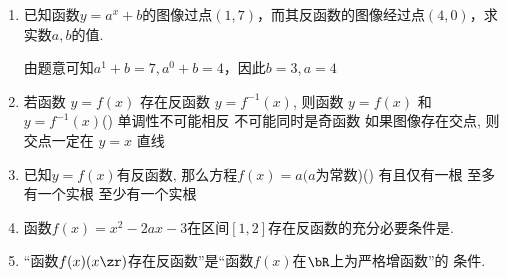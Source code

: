 \begin{enumerate}
        \item 已知函数$y = a^x+b$的图像过点$(1,7)$，而其反函数的图像经过点$(4, 0)$，求实数$a, b$的值.
        \begin{jieda}
            由题意可知$a^1+b=7, a^0+b=4$，因此$b = 3, a = 4$
        \end{jieda}
        
        \item 若函数 $y=f(x)$ 存在反函数 $y=f^{-1}(x)$, 则函数 $y=f(x)$ 和 $y=f^{-1}(x)$\dotfill()
        {单调性不可能相反}
        {不可能同时是奇函数}
        {如果图像存在交点, 则交点一定在 $y=x$ 直线}
        
        \item 已知$y=f(x)$有反函数, 那么方程$f(x)=a(a$为常数)\dotfill()
        {有且仅有一根}
        {至多有一个实根}
        {至少有一个实根}
        
        \item 函数$f(x)=x^2-2ax-3$在区间$[1,2]$存在反函数的充分必要条件是\blkda[4]{$a\in(-\infty,1]\cup[2,+\infty)$}.
        
        \item ``函数$f(x)(x\zr)$存在反函数''是``函数$f(x)$在$\bR$上为严格增函数''的 条件. 
    \end{enumerate}
